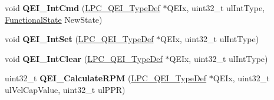 \begin{DoxyCompactItemize}
\item 
\hypertarget{group___q_e_i___public___functions_ga71b133c13b24a5db6da3da75ef69148d}{void {\bfseries \-Q\-E\-I\-\_\-\-Int\-Cmd} (\hyperlink{struct_l_p_c___q_e_i___type_def}{\-L\-P\-C\-\_\-\-Q\-E\-I\-\_\-\-Type\-Def} $\ast$\-Q\-E\-Ix, uint32\-\_\-t ul\-Int\-Type, \hyperlink{group___l_p_c___types___public___types_gac9a7e9a35d2513ec15c3b537aaa4fba1}{\-Functional\-State} \-New\-State)}\label{group___q_e_i___public___functions_ga71b133c13b24a5db6da3da75ef69148d}

\item 
\hypertarget{group___q_e_i___public___functions_ga839e92bc96055a7a4c02c245e3af5c35}{void {\bfseries \-Q\-E\-I\-\_\-\-Int\-Set} (\hyperlink{struct_l_p_c___q_e_i___type_def}{\-L\-P\-C\-\_\-\-Q\-E\-I\-\_\-\-Type\-Def} $\ast$\-Q\-E\-Ix, uint32\-\_\-t ul\-Int\-Type)}\label{group___q_e_i___public___functions_ga839e92bc96055a7a4c02c245e3af5c35}

\item 
\hypertarget{group___q_e_i___public___functions_ga8bcc66a6ddbcaf8daff9480dae45ee8c}{void {\bfseries \-Q\-E\-I\-\_\-\-Int\-Clear} (\hyperlink{struct_l_p_c___q_e_i___type_def}{\-L\-P\-C\-\_\-\-Q\-E\-I\-\_\-\-Type\-Def} $\ast$\-Q\-E\-Ix, uint32\-\_\-t ul\-Int\-Type)}\label{group___q_e_i___public___functions_ga8bcc66a6ddbcaf8daff9480dae45ee8c}

\item 
\hypertarget{group___q_e_i___public___functions_ga158401476f2598365f19d0ae86ea4dea}{uint32\-\_\-t {\bfseries \-Q\-E\-I\-\_\-\-Calculate\-R\-P\-M} (\hyperlink{struct_l_p_c___q_e_i___type_def}{\-L\-P\-C\-\_\-\-Q\-E\-I\-\_\-\-Type\-Def} $\ast$\-Q\-E\-Ix, uint32\-\_\-t ul\-Vel\-Cap\-Value, uint32\-\_\-t ul\-P\-P\-R)}\label{group___q_e_i___public___functions_ga158401476f2598365f19d0ae86ea4dea}

\end{DoxyCompactItemize}
